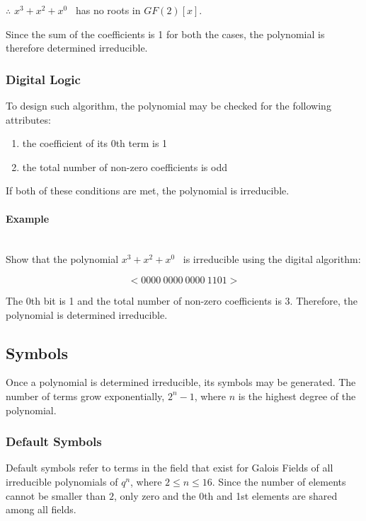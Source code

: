 \documentclass[11pt]{extarticle}
\newcommand{\examplepoly}{$x^{3}+x^{2}+x^{0}$}
\begin{document}
                \centerline{$\therefore$ \examplepoly~ has no roots in
                $GF(2)[x]$.}

                Since the sum of the coefficients is 1 for both the cases, the
                polynomial is therefore determined irreducible.

            \subsubsection{Digital Logic} To design such algorithm, the
            polynomial may be checked for the following attributes:
            \begin{enumerate}
                \item the coefficient of its 0th term is 1
                \item the total number of non-zero coefficients is odd
            \end{enumerate}

            If both of these conditions are met, the polynomial is irreducible.

            \paragraph{Example} \leavevmode \\ Show that the polynomial
            \examplepoly~ is irreducible using the digital algorithm:

                \[ <0000 \ 0000 \ 0000 \ 1101> \]

            The 0th bit is 1 and the total number of non-zero coefficients is
            3. Therefore, the polynomial is determined irreducible.

        \newpage

        \subsection{Symbols}

            Once a polynomial is determined irreducible, its symbols may be
            generated. The number of terms grow exponentially, $2^{n}-1$, where
            $n$ is the highest degree of the polynomial.

            \subsubsection{Default Symbols}

            Default symbols refer to terms in the field that exist for Galois
            Fields of all irreducible polynomials of $q^n$, where $2 \leq n
            \leq 16$. Since the number of elements cannot be smaller than $2$,
            only zero and the 0th and 1st elements are shared among all fields.
\end{document}
